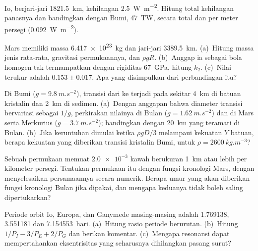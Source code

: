 \begin{exercise}[$\star$]\label{exo:b3:planetary-interiors-surfaces:4}
Io, berjari-jari \qty{1821.5}{km}, kehilangan \qty{2.5}{W.m^{-2}}. Hitung
total kehilangan panasnya dan bandingkan dengan Bumi, \qty{47}{TW}, secara total dan
per meter persegi (\qty{0.092}{W.m^{-2}}).
\end{exercise}

\begin{exercise}[$\star\star$]\label{exo:b3:planetary-interiors-surfaces:5}
Mars memiliki massa \qty{6.417e23}{kg} dan jari-jari \qty{3389.5}{km}.
(a)~Hitung massa jenis rata-rata, gravitasi permukaannya, dan $\rho gR$.
(b)~Anggap ia sebagai bola homogen tak termampatkan dengan rigiditas
\qty{67}{GPa}, hitung  $k_2$. (c)~Nilai terukur adalah
$0.153 \pm 0.017$. Apa yang disimpulkan dari perbandingan itu?
\end{exercise}

\begin{exercise}[$\star\star$]\label{exo:b3:planetary-interiors-surfaces:6}
Di Bumi ($g = \qty{9.8}{m.s^{-2}}$), transisi dari  ke 
terjadi pada sekitar \qty{4}{km} di batuan kristalin dan \qty{2}{km} di
sedimen. (a)~Dengan anggapan bahwa diameter transisi bervariasi sebagai $1/g$,
perkirakan nilainya di Bulan ($g = \qty{1.62}{m.s^{-2}}$) dan di Mars serta
Merkurius ($g = \qty{3.7}{m.s^{-2}}$); bandingkan dengan \qty{20}{km}
yang teramati di Bulan. (b)~Jika keruntuhan dimulai ketika $\rho gD/3$ melampaui
kekuatan $Y$ batuan, berapa kekuatan yang diberikan transisi kristalin
Bumi, untuk $\rho = \qty{2600}{kg.m^{-3}}$?
\end{exercise}

\begin{exercise}[$\star\star$]\label{exo:b3:planetary-interiors-surfaces:7}
Sebuah permukaan memuat $\num{2.0e-3}$ kawah berukuran \qty{1}{km} atau lebih per
kilometer persegi. Tentukan  permukaan itu dengan fungsi kronologi Mars,
dengan menyelesaikan persamaannya secara numerik. Berapa umur yang akan diberikan fungsi kronologi Bulan
jika dipakai, dan mengapa keduanya tidak boleh saling dipertukarkan?
\end{exercise}

\begin{exercise}[$\star\star$]\label{exo:b3:planetary-interiors-surfaces:8}
Periode orbit Io, Europa, dan Ganymede masing-masing adalah 1.769138, 3.551181 dan
\num{7.154553}~hari. (a)~Hitung rasio periode berurutan.
(b)~Hitung $1/P_I - 3/P_E + 2/P_G$ dan berikan komentar. (c)~Mengapa resonansi
dapat mempertahankan eksentrisitas yang seharusnya dihilangkan pasang surut?
\end{exercise}


